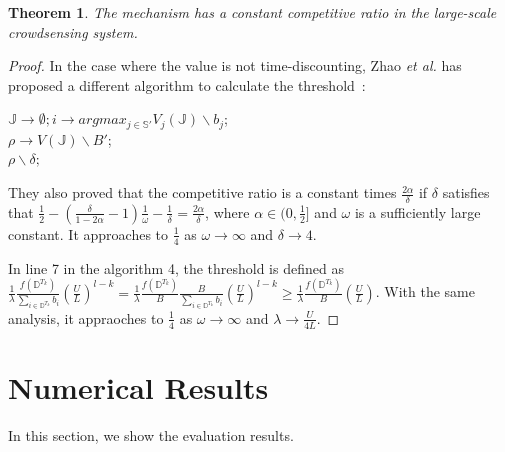\documentclass[conference,compsocconf,letterpaper,10pt]{IEEEtran}
\newtheorem{theorem}{Theorem}
\newcommand{\et}{{\em et al. }}
\begin{document}
\begin{theorem}
The mechanism has a constant competitive ratio in the large-scale crowdsensing system.
\end{theorem}
\begin{proof}
In the case where the value is not time-discounting, Zhao \et has proposed a different algorithm to calculate the threshold~\cite{zhao2014crowdsource}:

\begin{algorithm}
\BlankLine
{}
\caption{}
\label{alg:GetThreshold}
\begin{small}
\BlankLine
$\mathbb{J}\rightarrow\emptyset; i\rightarrow argmax_{j\in\mathbb{S}'}V_j(\mathbb{J})\backslash b_j$;\\

$\rho\rightarrow V(\mathbb{J})\backslash B'$;\\
\Return $\rho\backslash \delta;$
\end{small}
\end{algorithm}
They also proved that the competitive ratio is a constant times $\frac{2\alpha}{\delta}$ if $\delta$ satisfies that $\frac{1}{2}-(\frac{\delta}{1-2\alpha}-1)\frac{1}{\omega}-\frac{1}{\delta}=\frac{2\alpha}{\delta}$, where $\alpha\in(0,\frac{1}{2}]$ and $\omega$ is a sufficiently large constant. It approaches to $\frac{1}{4}$ as $\omega\to\infty$ and $\delta\to4$.

In line 7 in the algorithm 4, the threshold is defined as $\frac{1}{\lambda}\frac{f(\mathbb{D}^{T_k})}{\sum_{i\in\mathbb{D}^{T_k}}b_i}\left(\frac{U}{L}\right)^{l-k}=\frac{1}{\lambda}\frac{f(\mathbb{D}^{T_k})}{B}\frac{B}{\sum_{i\in\mathbb{D}^{T_k}}b_i}\left(\frac{U}{L}\right)^{l-k}\ge\frac{1}{\lambda}\frac{f(\mathbb{D}^{T_k})}{B}\left(\frac{U}{L}\right)$. With the same analysis, it appraoches to $\frac{1}{4}$ as $\omega\to\infty$ and $\lambda\to\frac{U}{4L}$.
\end{proof}
\section{Numerical Results}
In this section, we show the evaluation results.
\end{document}
